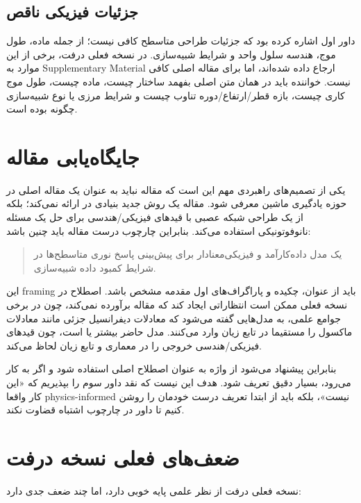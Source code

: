\subsection{جزئیات فیزیکی ناقص}
داور اول  اشاره کرده بود که جزئیات طراحی متاسطح کافی نیست؛ از جمله ماده، طول موج، هندسه سلول واحد و شرایط شبیه‌سازی. در نسخه فعلی درفت، برخی از این موارد به Supplementary Material ارجاع داده شده‌اند، اما برای مقاله اصلی کافی نیست. خواننده باید در همان متن اصلی بفهمد ساختار چیست، ماده چیست، طول موج کاری چیست، بازه قطر/ارتفاع/دوره تناوب چیست و شرایط مرزی یا نوع شبیه‌سازی چگونه بوده است.

\section{جایگاه‌یابی مقاله}
یکی از تصمیم‌های راهبردی مهم این است که مقاله نباید به عنوان یک مقاله اصلی در حوزه یادگیری ماشین معرفی شود. مقاله یک روش جدید بنیادی در  ارائه نمی‌کند؛ بلکه از یک طراحی شبکه عصبی با قیدهای فیزیکی/هندسی برای حل یک مسئله نانوفوتونیکی استفاده می‌کند. بنابراین چارچوب درست مقاله باید چنین باشد:

\begin{quote}
	یک مدل داده‌کارآمد و فیزیکی‌معنادار برای پیش‌بینی پاسخ نوری متاسطح‌ها در شرایط کمبود داده شبیه‌سازی.
\end{quote}

این framing باید از عنوان، چکیده و پاراگراف‌های اول مقدمه مشخص باشد. اصطلاح  در نسخه فعلی ممکن است انتظاراتی ایجاد کند که مقاله برآورده نمی‌کند، چون در برخی جوامع علمی،  به مدل‌هایی گفته می‌شود که معادلات دیفرانسیل جزئی مانند معادلات ماکسول را مستقیما در تابع زیان وارد می‌کنند. مدل حاضر بیشتر  یا  است، چون قیدهای فیزیکی/هندسی خروجی را در معماری و تابع زیان لحاظ می‌کند.

بنابراین پیشنهاد می‌شود از واژه  به عنوان اصطلاح اصلی استفاده شود و اگر  به کار می‌رود، بسیار دقیق تعریف شود. هدف این نیست که نقد داور سوم را بپذیریم که «این کار واقعا physics-informed نیست»، بلکه باید از ابتدا تعریف درست خودمان را روشن کنیم تا داور در چارچوب اشتباه قضاوت نکند.

\section{ضعف‌های فعلی نسخه درفت}
نسخه فعلی درفت از نظر علمی پایه خوبی دارد، اما چند ضعف جدی دارد:



